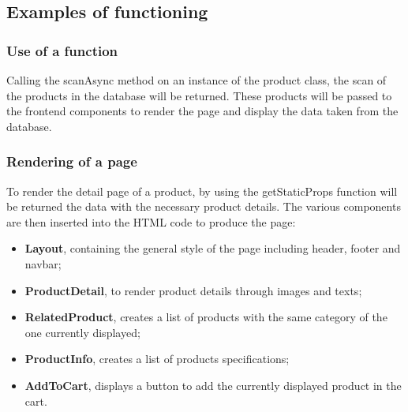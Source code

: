 \subsection{Examples of functioning}
\subsubsection{Use of a function}
Calling the scanAsync method on an instance of the product class, the scan of the products in the database will be returned. These products will be passed to the frontend components to render the page and display the data taken from the database.
\subsubsection{Rendering of a page}
To render the detail page of a product, by using the getStaticProps function will be returned the data with the necessary product details. The various components are then inserted into the HTML code to produce the page:
\begin{itemize}
  \item \textbf{Layout}, containing the general style of the page including header, footer and navbar;
  \item \textbf{ProductDetail}, to render product details through images and texts;
  \item \textbf{RelatedProduct}, creates a list of products with the same category of the one currently displayed;
  \item \textbf{ProductInfo}, creates a list of products specifications;
  \item \textbf{AddToCart}, displays a button to add the currently displayed product in the cart.
\end{itemize}

